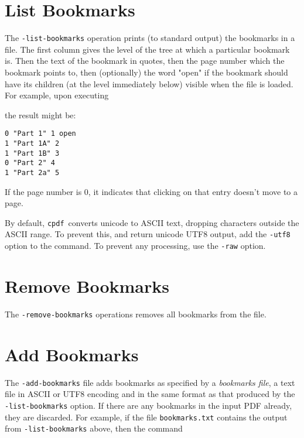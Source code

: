 \documentclass{book}
\newcommand{\cpdf}{\texttt{cpdf}}
\begin{document}
  \section{List Bookmarks}
  The \texttt{-list-bookmarks} operation prints (to standard output) the
bookmarks in a file. The first column gives the level of the tree at which a
particular bookmark is. Then the text of the bookmark in quotes, then the page
number which the bookmark points to, then (optionally) the word "open" if the
bookmark should have its children (at the level immediately below) visible when
the file is loaded. For example, upon executing

\noindent{}

\noindent the result might be:

\begin{verbatim}
0 "Part 1" 1 open
1 "Part 1A" 2
1 "Part 1B" 3
0 "Part 2" 4
1 "Part 2a" 5\end{verbatim}

\noindent If the page number is 0, it indicates that clicking on that entry doesn't move to a page.

By default, \cpdf\ converts unicode to ASCII text, dropping characters outside
the ASCII range. To prevent this, and return unicode UTF8 output, add the
\texttt{-utf8} option to the command. To prevent any processing, use the
\texttt{-raw} option.

  \section{Remove Bookmarks}
  \label{removebookmarks}
  The \texttt{-remove-bookmarks} operations removes all bookmarks from the file.

\noindent{}

  \section{Add Bookmarks}
  
  The \texttt{-add-bookmarks} file adds bookmarks as specified by a
\textit{bookmarks file}, a text file in ASCII or UTF8 encoding and in the same format as that produced by the
\texttt{-list-bookmarks} option. If there are any bookmarks in the input PDF
already, they are discarded. For example, if the file \texttt{bookmarks.txt}
contains the output from \texttt{-list-bookmarks} above, then the command
\noindent{}
\end{document}
